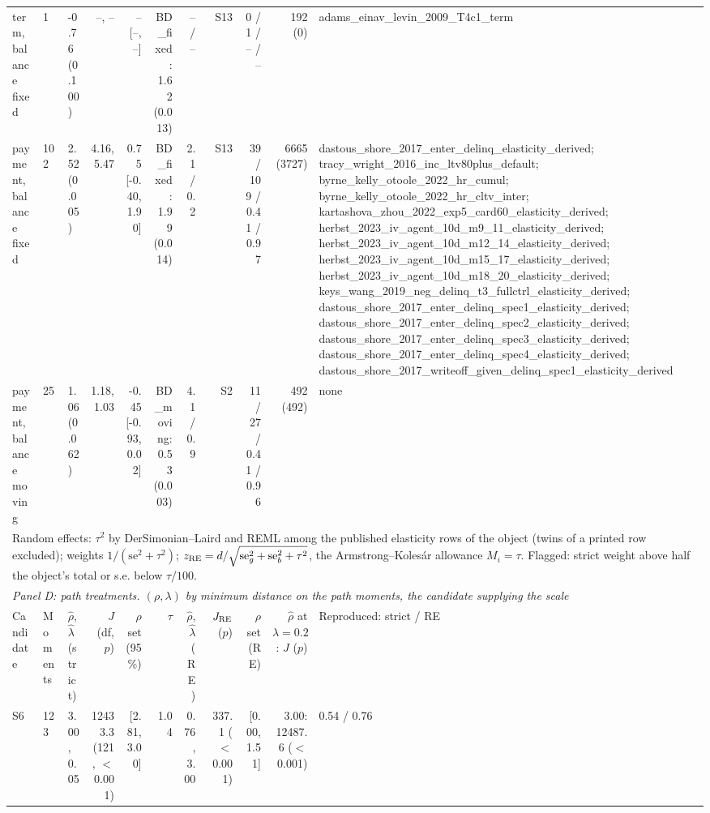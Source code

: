 \begin{tabular}{llp{4.2cm}rrrrrrrp{4.6cm}}
\midrule
term, balance fixed & 1 & -0.76 (0.100) & --, -- & -- [--, --] & BD\_fixed: 1.62 (0.013) & -- / -- & S13 & 0 / 1 / -- / -- & 192 (0) & adams\_einav\_levin\_2009\_T4c1\_term \\
payment, balance fixed & 102 & 2.52 (0.005) & 4.16, 5.47 & 0.75 [-0.40, 1.90] & BD\_fixed: 1.99 (0.014) & 2.1 / 0.2 & S13 & 39 / 109 / 0.41 / 0.97 & 6665 (3727) & dastous\_shore\_2017\_enter\_delinq\_elasticity\_derived; tracy\_wright\_2016\_inc\_ltv80plus\_default; byrne\_kelly\_otoole\_2022\_hr\_cumul; byrne\_kelly\_otoole\_2022\_hr\_cltv\_inter; kartashova\_zhou\_2022\_exp5\_card60\_elasticity\_derived; herbst\_2023\_iv\_agent\_10d\_m9\_11\_elasticity\_derived; herbst\_2023\_iv\_agent\_10d\_m12\_14\_elasticity\_derived; herbst\_2023\_iv\_agent\_10d\_m15\_17\_elasticity\_derived; herbst\_2023\_iv\_agent\_10d\_m18\_20\_elasticity\_derived; keys\_wang\_2019\_neg\_delinq\_t3\_fullctrl\_elasticity\_derived; dastous\_shore\_2017\_enter\_delinq\_spec1\_elasticity\_derived; dastous\_shore\_2017\_enter\_delinq\_spec2\_elasticity\_derived; dastous\_shore\_2017\_enter\_delinq\_spec3\_elasticity\_derived; dastous\_shore\_2017\_enter\_delinq\_spec4\_elasticity\_derived; dastous\_shore\_2017\_writeoff\_given\_delinq\_spec1\_elasticity\_derived \\
payment, balance moving & 25 & 1.06 (0.062) & 1.18, 1.03 & -0.45 [-0.93, 0.02] & BD\_moving: 0.53 (0.003) & 4.1 / 0.9 & S2 & 11 / 27 / 0.41 / 0.96 & 492 (492) & none \\
\multicolumn{11}{l}{\footnotesize Random effects: $\tau^2$ by DerSimonian--Laird and REML among the published elasticity rows of the object (twins of a printed row excluded); weights $1/(\mathrm{se}^2 + \tau^2)$; $z_{\rm RE} = d / \sqrt{\mathrm{se}_g^2 + \mathrm{se}_b^2 + \tau^2}$, the Armstrong--Koles\'ar allowance $M_i = \tau$. Flagged: strict weight above half the object's total or s.e. below $\tau/100$.} \\
\midrule
\multicolumn{11}{l}{\textit{Panel D: path treatments. $(\rho, \lambda)$ by minimum distance on the path moments, the candidate supplying the scale}} \\
Candidate & Moments & $\hat\rho$, $\hat\lambda$ (strict) & $J$ (df, $p$) & $\rho$ set (95\%) & $\tau$ & $\hat\rho$, $\hat\lambda$ (RE) & $J_{\rm RE}$ ($p$) & $\rho$ set (RE) & $\hat\rho$ at $\lambda = 0.2$: $J$ ($p$) & Reproduced: strict / RE \\
\midrule
S6 & 123 & 3.00, 0.05 & 12433.3 (121, $<$0.001) & [2.81, 3.00] & 1.04 & 0.76, 3.00 & 337.1 ($<$0.001) & [0.00, 1.51] & 3.00: 12487.6 ($<$0.001) & 0.54 / 0.76 \\

\end{tabular}
